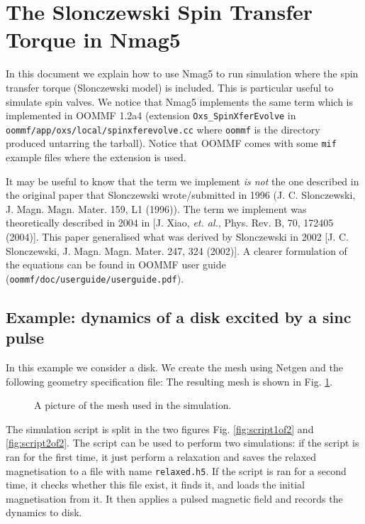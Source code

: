 \documentclass[11pt,oneside,openany]{article}
\author{Matteo Franchin}
\begin{document}
\titlepage

\section{The Slonczewski Spin Transfer Torque in Nmag5}
In this document we explain how to use Nmag5 to run simulation where the
spin transfer torque (Slonczewski model) is included. This is particular
useful to simulate spin valves. We notice that Nmag5 implements the same
term which is implemented in OOMMF 1.2a4 (extension \verb|Oxs_SpinXferEvolve|
in \verb|oommf/app/oxs/local/spinxferevolve.cc| where \verb|oommf| is the
directory produced untarring the tarball). Notice that OOMMF comes with some
\verb|mif| example files where the extension is used.

It may be useful to know that the term we implement \emph{is not} the one
described in the original paper that Slonczewski wrote/submitted in 1996
(J. C. Slonczewski, J. Magn. Magn. Mater. 159, L1 (1996)).
The term we implement was theoretically described in 2004
in [J. Xiao, \emph{et. al.}, Phys. Rev. B, 70, 172405 (2004)].
This paper generalised what was derived by Slonczewski in 2002
[J. C. Slonczewski, J. Magn. Magn. Mater. 247, 324 (2002)].
A clearer formulation of the equations can be found in OOMMF user guide
(\verb|oommf/doc/userguide/userguide.pdf|).


\subsection{Example: dynamics of a disk excited by a sinc pulse}
In this example we consider a disk. We create the mesh using Netgen and
the following geometry specification file:
%
%
%
The resulting mesh is shown in Fig. \ref{fig:mesh}.
%
\begin{figure}[h]
\begin{center}
\caption[Sketch]{A picture of the mesh used in the simulation.}
\label{fig:mesh}
\end{center}
\end{figure}
%
The simulation script is split in the two figures Fig. \ref{fig:script1of2} and
\ref{fig:script2of2}.  The script can be used to perform two simulations: if
the script is ran for the first time, it just perform a relaxation and saves
the relaxed magnetisation to a file with name \verb|relaxed.h5|. If the script
is ran for a second time, it checks whether this file exist, it finds it, and
loads the initial magnetisation from it. It then applies a pulsed magnetic
field and records the dynamics to disk.
\end{document}
